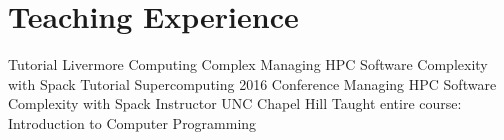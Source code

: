 \section{Teaching Experience}
		{Tutorial}
		{Livermore Computing Complex}{}
		{Managing HPC Software Complexity with Spack}{}
		{Tutorial}
		{Supercomputing 2016 Conference}{}
		{Managing HPC Software Complexity with Spack}{}
		{Instructor}
		{UNC Chapel Hill}{}
		{Taught entire course: Introduction to Computer Programming}{}
